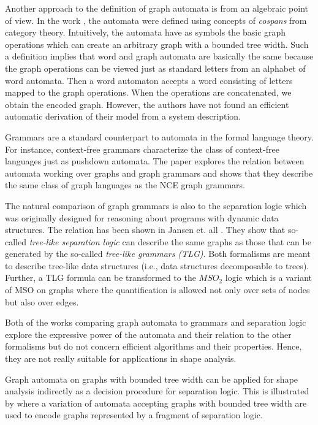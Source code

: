 	Another approach to the definition of graph automata is from an algebraic point of view.
	In the work \cite{soa-blume:2012}, the automata were defined using concepts
	of \emph{cospans} from category theory.
	Intuitively, the automata have as symbols the basic graph operations which can create
	an arbitrary graph with a bounded tree width.
	Such a definition implies that word and graph automata are basically the same
	because the graph operations can be viewed just as standard letters from an alphabet of word automata.
	Then a word automaton accepts a word consisting of letters mapped to the graph operations.
	When the operations are concatenated, we obtain the encoded graph.
	However, the authors have not found an efficient automatic derivation of their model
	from a system description.

	Grammars are a standard counterpart to automata in the formal language theory.
	For instance, context-free grammars characterize the class of context-free languages just
	as pushdown automata.
	The paper \cite{soa-brandenburg05} explores the relation between automata working over
	graphs and graph grammars and shows that they describe the same class of graph languages as
	the NCE graph grammars.
	
	The natural comparison of graph grammars is also to the separation logic which was originally designed
	for reasoning about programs with dynamic data structures.
	The relation has been shown in Jansen et. all \cite{matheja_treelike_2015}.
	They show that so-called \emph{tree-like separation logic} can describe the same graphs
	as those that can be generated by the so-called \emph{tree-like grammars (TLG)}.
	Both formalisms are meant to describe tree-like data structures (i.e., data structures
	decomposable to trees).
	Further, a TLG formula can be transformed to the $MSO_2$ logic which is a variant of MSO
	on graphs where the quantification is allowed not only over sets of nodes but also
	over edges.

	Both of the works comparing graph automata to grammars and separation logic
	explore the expressive power of the automata and their relation to the other formalisms
	but do not concern efficient algorithms and their properties.
	Hence, they are not really suitable for applications in shape analysis.

	Graph automata on graphs with bounded tree width can be applied for shape analysis
	indirectly as a decision procedure for separation logic.
	This is illustrated by \cite{iosif_treewidth_2013} where a variation of automata
	accepting graphs with bounded tree width are used to encode graphs represented
	by a fragment of separation logic.

